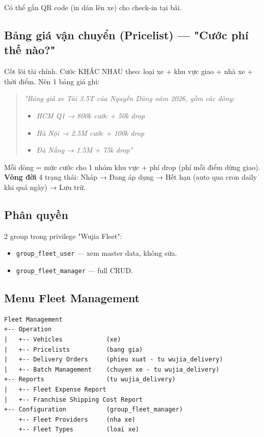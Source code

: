 Có thể gắn QR code (in dán lên xe) cho check-in tại bãi.

\subsection{Bảng giá vận chuyển (Pricelist) --- "Cước phí thế nào?"}

Cốt lõi tài chính. Cước KHÁC NHAU theo: loại xe + khu vực giao + nhà xe + thời điểm. Nên 1 bảng giá ghi:

\begin{quote}
\textit{"Bảng giá xe Tải 3.5T của Nguyễn Dũng năm 2026, gồm các dòng:}
\begin{itemize}
    \item \textit{HCM Q1 → 800k cước + 50k drop}
    \item \textit{Hà Nội → 2.5M cước + 100k drop}
    \item \textit{Đà Nẵng → 1.5M + 75k drop"}
\end{itemize}
\end{quote}

Mỗi dòng = mức cước cho 1 nhóm khu vực + phí drop (phí mỗi điểm dừng giao). \textbf{Vòng đời} 4 trạng thái: Nháp → Đang áp dụng → Hết hạn (auto qua cron daily khi quá ngày) → Lưu trữ.

\subsection{Phân quyền}

2 group trong privilege "Wujia Fleet":
\begin{itemize}
    \item \texttt{group\_fleet\_user} --- xem master data, không sửa.
    \item \texttt{group\_fleet\_manager} --- full CRUD.
\end{itemize}

\subsection{Menu Fleet Management}

\begin{lstlisting}[style=shell]
Fleet Management
+-- Operation
|   +-- Vehicles            (xe)
|   +-- Pricelists          (bang gia)
|   +-- Delivery Orders     (phieu xuat - tu wujia_delivery)
|   +-- Batch Management    (chuyen xe - tu wujia_delivery)
+-- Reports                 (tu wujia_delivery)
|   +-- Fleet Expense Report
|   +-- Franchise Shipping Cost Report
+-- Configuration           (group_fleet_manager)
    +-- Fleet Providers     (nha xe)
    +-- Fleet Types         (loai xe)
\end{lstlisting}

